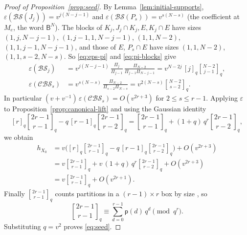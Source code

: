 \documentclass[11pt,a4paper,reqno]{amsart}
\numberwithin{equation}{section}
\theoremstyle{definition}
\theoremstyle{remark}
\theoremstyle{plain}
\newcommand{\eps}{\varepsilon}
\newcommand{\B}{\mathsf B}
\newcommand{\gb}[2]{\genfrac{[}{]}{0pt}{}{#1}{#2}_q}
\newcommand{\Part}{\mathsf p}
\newcommand{\D}{\mathcal {BS}}
\newcommand{\R}{\mathcal {BS}}
\newcommand{\V}{\mathcal {CBS}}
\begin{document}
\begin{proof}[Proof of Proposition~\ref{prop:seed}]
By Lemma~\ref{lem:initial-supports}, $\eps(\D(J_j))=v^{j(N-j-1)}$ and $\eps(\D(P_s))=v^{s(N-s)}$ (the coefficient at $M_e$, the word $\B^N$).
The blocks of $K_j,J_j\cap K_j,E,K_j\cap E$ have sizes $(1,j,N-j-1)$, $(1,j-1,1,N-j-1)$, $(1,1,N-2)$, $(1,1,j-1,N-j-1)$,
and those of $E$, $P_s\cap E$ have sizes $(1,1,N-2)$, $(1,1,s-2,N-s)$. So \eqref{eq:eps-pi} and \eqref{eq:pi-blocks} give
\begin{align}
 \eps(\R_j)&=v^{j(N-j-1)}\,\frac{\Pi_j}{\Pi_{j-1}}\,\frac{\Pi_{N-2}}{\Pi_{j-1}\Pi_{N-j-1}}
 =v^{N-2j}\,[j]_q\gb{N-2}{j-1},\\[4pt]
 \eps(\V_s)&=v^{s(N-s)}\,\frac{\Pi_{N-2}}{\Pi_{s-2}\Pi_{N-s}}
 =v^{2(N-s)}\gb{N-2}{s-2}.
\end{align}
In particular $(v+v^{-1})\,\eps(\V_s)=O(v^{2r+3})$ for $2\leq s\leq r-1$. Applying $\eps$ to
Proposition~\ref{prop:canonical-lift} and using the Gaussian identity
\[
 [r]_q\gb{2r-1}{r-1}-q\,[r-1]_q\gb{2r-1}{r-2}
 =\gb{2r-1}{r-1}+(1+q)\,q^{r}\gb{2r-1}{r-2},
\]
we obtain
\begin{align}
 h_{X_0}
 &=v\biggl([r]_q\gb{2r-1}{r-1}-q\,[r-1]_q\gb{2r-1}{r-2}\biggr)+O(v^{2r+3})\\[4pt]
 &=v\gb{2r-1}{r-1}+v\,(1+q)\,q^{r}\gb{2r-1}{r-2}+O(v^{2r+3})\\[4pt]
 &=v\gb{2r-1}{r-1}+O(v^{2r+1}).
\end{align}
Finally $\gb{2r-1}{r-1}$ counts partitions in a $(r-1)\times r$ box by size \cite[Proposition~1.7.3]{StanleyEC1}, so
\[
 \gb{2r-1}{r-1}\equiv\sum_{d=0}^{r-1}\Part(d)\,q^{d}\pmod{q^{r}}.
\]
Substituting $q=v^2$ proves \eqref{eq:seed}.
\end{proof}
\end{document}
